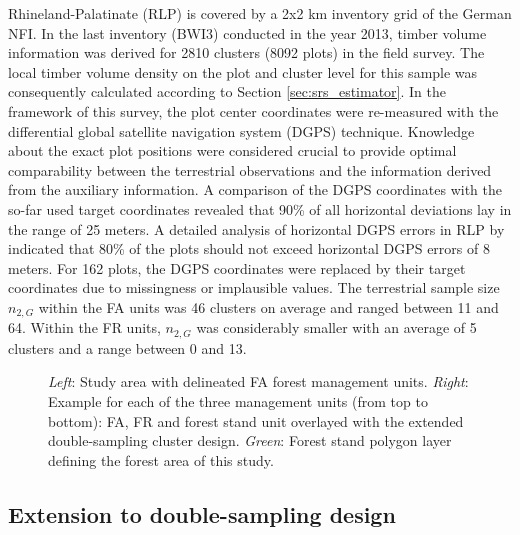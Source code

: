 \documentclass[remotesensing,article,submit,moreauthors,pdftex,10pt,a4paper]{mdpi}
\begin{document}
Rhineland-Palatinate (RLP) is covered by a 2x2 km inventory grid of the German NFI. In the last inventory (BWI3) conducted in the year 2013, timber volume information was derived for 2810 clusters (8092 plots) in the field survey. The local timber volume density on the plot and cluster level for this sample was consequently calculated according to Section \ref{sec:srs_estimator}. In the framework of this survey, the plot center coordinates were re-measured with the differential global satellite navigation system (DGPS) technique. Knowledge about the exact plot positions were considered crucial to provide optimal comparability between the terrestrial observations and the information derived from the auxiliary information. A comparison of the DGPS coordinates with the so-far used target coordinates revealed that 90\% of all horizontal deviations lay in the range of 25 meters. A detailed analysis of horizontal DGPS errors in RLP by \citet{lambrecht2017} indicated that 80\% of the plots should not exceed horizontal DGPS errors of 8 meters. For 162 plots, the DGPS coordinates were replaced by their target coordinates due to missingness or implausible values. The terrestrial sample size $n_{2,G}$ within the FA units was 46 clusters on average and ranged between 11 and 64. Within the FR units, $n_{2,G}$ was considerably smaller with an average of 5 clusters and a range between 0 and 13.

\begin{figure}[H]
	\centering
	\caption{\textit{Left}: Study area with delineated FA forest management units. \textit{Right}: Example for each of the three management units (from top to bottom): FA, FR and forest stand unit overlayed with the extended double-sampling cluster design. \textit{Green}: Forest stand polygon layer defining the forest area of this study.}
	\label{fig:StudyArean}
\end{figure}

\subsection{Extension to double-sampling design}
\label{ext_to_2phase}
\end{document}

